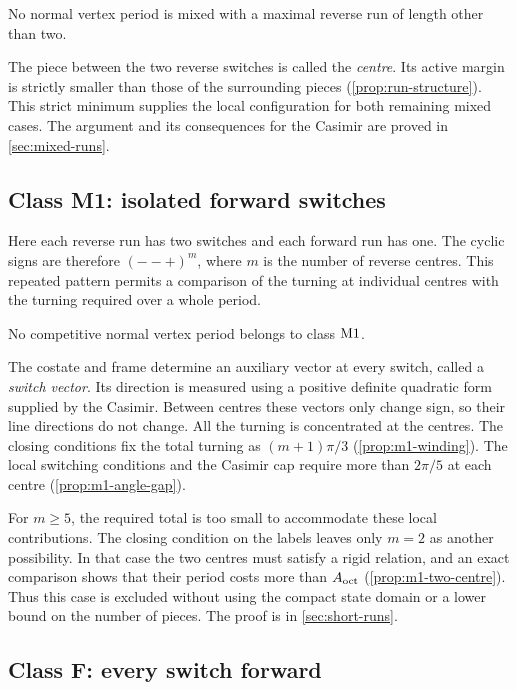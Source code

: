 \begin{theorem}\label{thm:class-M3}
No normal vertex period is mixed with a maximal reverse run of length other than two.
\end{theorem}

The piece between the two reverse switches is called the \emph{centre}. Its active margin is
strictly smaller than those of the surrounding pieces (\cref{prop:run-structure}). This strict
minimum supplies the local configuration for both remaining mixed cases. The argument and its
consequences for the Casimir are proved in \cref{sec:mixed-runs}.

\subsection{Class M1: isolated forward switches}\label{sec:outline-short-runs}

Here each reverse run has two switches and each forward run has one. The cyclic signs are
therefore $(--+)^m$, where $m$ is the number of reverse centres. This repeated pattern permits a
comparison of the turning at individual centres with the turning required over a whole period.

\begin{theorem}\label{thm:class-M1}
No competitive normal vertex period belongs to class $\mathrm{M1}$.
\end{theorem}

The costate and frame determine an auxiliary vector at every switch, called a \emph{switch
vector}. Its direction is measured using a positive definite quadratic form supplied by the
Casimir. Between centres these vectors only change sign, so their line directions do not change.
All the turning is concentrated at the centres. The closing conditions fix the total turning as
$(m+1)\pi/3$ (\cref{prop:m1-winding}). The local switching conditions and the Casimir cap require
more than $2\pi/5$ at each centre (\cref{prop:m1-angle-gap}).

For $m\ge5$, the required total is too small to accommodate these local contributions. The
closing condition on the labels leaves only $m=2$ as another possibility. In that case the two
centres must satisfy a rigid relation, and an exact comparison shows that their period costs
more than $A_{\mathrm{oct}}$ (\cref{prop:m1-two-centre}). Thus this case is excluded without using the
compact state domain or a lower bound on the number of pieces. The proof is in
\cref{sec:short-runs}.

\subsection{Class F: every switch forward}\label{sec:outline-forward}


